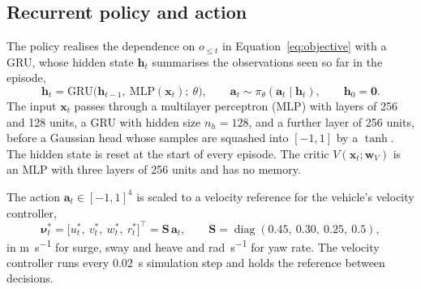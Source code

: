 \subsection{Recurrent policy and action}
\label{sec:policy}
The policy realises the dependence on $o_{\le t}$ in Equation~\eqref{eq:objective} with a GRU, whose hidden state $\mathbf{h}_t$ summarises the observations seen so far in the episode,
\begin{equation}
  \mathbf{h}_t = \mathrm{GRU}\bigl(\mathbf{h}_{t-1},\ \mathrm{MLP}(\mathbf{x}_t);\ \theta\bigr), \qquad
  \mathbf{a}_t \sim \pi_\theta(\mathbf{a}_t \mid \mathbf{h}_t), \qquad \mathbf{h}_0 = \mathbf{0}.
  \label{eq:recurrent-policy}
\end{equation}
The input $\mathbf{x}_t$ passes through a multilayer perceptron (MLP) with layers of 256 and 128 units, a GRU with hidden size $n_h = 128$, and a further layer of 256 units, before a Gaussian head whose samples are squashed into $[-1,1]$ by a $\tanh$. The hidden state is reset at the start of every episode. The critic $V(\mathbf{x}_t;\mathbf{w}_V)$ is an MLP with three layers of 256 units and has no memory.

The action $\mathbf{a}_t \in [-1,1]^4$ is scaled to a velocity reference for the vehicle's velocity controller,
\begin{equation}
  \boldsymbol{\nu}^{*}_t = \bigl[u^{*}_t,\ v^{*}_t,\ w^{*}_t,\ r^{*}_t\bigr]^\top = \mathbf{S}\,\mathbf{a}_t, \qquad
  \mathbf{S} = \operatorname{diag}(0.45,\ 0.30,\ 0.25,\ 0.5),
  \label{eq:action}
\end{equation}
in \si{\metre\per\second} for surge, sway and heave and \si{\radian\per\second} for yaw rate. The velocity controller runs every \SI{0.02}{\second} simulation step and holds the reference between decisions.

